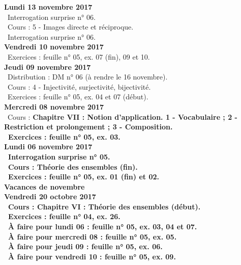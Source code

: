 \documentclass[12pt,a4paper]{article}
\begin{document}
\noindent\textbf{Lundi 13 novembre 2017}\\
\bu\ Interrogation surprise n° 06.\\
\bu\ Cours : 5 - Images directe et réciproque.\\
\bu\ Interrogation surprise n° 06.\\

\noindent\textbf{Vendredi 10 novembre 2017}\\
\bu\ Exercices : feuille n° 05, ex. 07 (fin), 09 et 10.\vspace{.4cm}\\
 
\noindent\textbf{Jeudi 09 novembre 2017}\\
\bu\ Distribution : DM n° 06 (à rendre le 16 novembre).\\
\bu\ Cours : 4 - Injectivité, surjectivité, bijectivité.\\
\bu\ Exercices : feuille n° 05, ex. 04 et 07 (début).\vspace{.4cm}\\

\noindent\textbf{\bf Mercredi 08 novembre 2017}\\
\bu\ Cours : \bf Chapitre VII \rm : Notion d'application. 1 - Vocabulaire ; 2 - Restriction et prolongement ; 3 - 
Composition.\\
\bu\ Exercices : feuille n° 05, ex. 03.\vspace{.4cm}\\

\noindent\textbf{Lundi 06 novembre 2017}\\
\bu\ Interrogation surprise n° 05.\\
\bu\ Cours : Théorie des ensembles (fin).\\
\bu\ Exercices : feuille n° 05, ex. 01 (fin) et 02.\vspace{.4cm}\\

\noindent\textbf{ Vacances de novembre }\vspace{.4cm}\\

\noindent\textbf{Vendredi 20 octobre 2017}\\
\bu\ Cours : \bf Chapitre VI \rm : Théorie des ensembles (début).\\
\bu\ Exercices : feuille n° 04, ex. 26.\\
\bu\ À faire pour lundi 06 : feuille n° 05, ex. 03, 04 et 07.\\
\bu\ À faire pour mercredi 08 : feuille n° 05, ex. 05.\\
\bu\ À faire pour jeudi 09 : feuille n° 05, ex. 06.\\
\bu\ À faire pour vendredi 10 : feuille n° 05, ex. 09.\vspace{.4cm}\\
\end{document}
